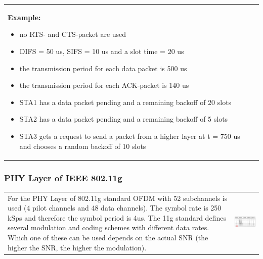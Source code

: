 \begin{tabular}{ll}
	\parbox{7cm}{
		\textbf{Example:} \\
		\begin{itemize}	
			\item  no RTS- and CTS-packet are used
			\item  DIFS = 50 us, SIFS = 10 us and a slot time = 20 us
			\item  the transmission period for each data packet is 500 us
			\item  the transmission period for each ACK-packet is 140 us
			\item  STA1 has a data packet pending and a remaining backoff of 20 slots
			\item  STA2 has a data packet pending and a remaining backoff of 5 slots
			\item  STA3 gets a request to send a packet from a higher layer at t = 750 us
			and chooses a random backoff of 10 slots
		\end{itemize}
	}
	& \parbox{11cm}{
		 \\ 
	}
\end{tabular}	
	
\subsubsection{PHY Layer of IEEE 802.11g}
	\begin{tabular}{ll}
		\parbox{11cm}{
			For the PHY Layer of 802.11g standard OFDM with 52 subchannels is used (4 pilot channels and 48 data channels). 
			The symbol rate is 250 kSps and therefore the symbol period is 4us. The 11g standard defines several modulation
			and coding schemes with different data rates. Which one of these can be used depends on the actual SNR
			(the higher the SNR, the higher the modulation). 				
		}
		& \parbox{7cm}{
			\includegraphics[width=7cm]{./bilder/wlan-phy.png} \\ 
		}
	\end{tabular}
	
